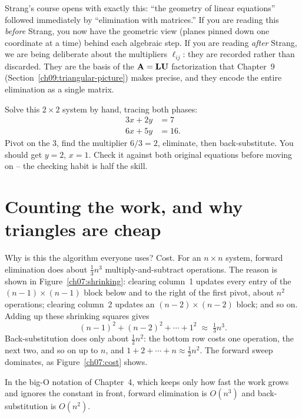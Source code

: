 \begin{strangbox}
Strang's course opens with exactly this: ``the geometry of linear equations''
followed immediately by ``elimination with matrices.'' If you are reading this
\emph{before} Strang, you now have the geometric view (planes pinned down one
coordinate at a time) behind each algebraic step.
If you are reading \emph{after} Strang, we are being deliberate about
the multipliers $\ell_{ij}$: they are recorded rather than discarded.
They are the basis of the $\mathbf{A}=\mathbf{LU}$ factorization that Chapter~9 (Section~\ref{ch09:triangular-picture})
makes precise, and they encode the entire elimination as a single matrix.
\end{strangbox}

\begin{labbox}
Solve this $2\times 2$ system by hand, tracing both phases:
\[
\begin{aligned}
3x + 2y &= 7\\
6x + 5y &= 16.
\end{aligned}
\]
Pivot on the $3$, find the multiplier $6/3 = 2$, eliminate, then back-substitute.
You should get $y = 2$, $x = 1$. Check it against both original equations before
moving on -- the checking habit is half the skill.
\end{labbox}

\section{Counting the work, and why triangles are cheap}

Why is this the algorithm everyone uses? Cost. For an $n\times n$ system, forward
elimination does about $\tfrac13 n^3$ multiply-and-subtract operations. The
reason is shown in Figure~\ref{ch07:shrinking}: clearing column~1 updates every
entry of the $(n-1)\times(n-1)$ block below and to the right of the first pivot,
about $n^2$ operations; clearing column~2 updates an $(n-2)\times(n-2)$ block;
and so on. Adding up these shrinking squares gives
\[
(n-1)^2 + (n-2)^2 + \cdots + 1^2 \;\approx\; \tfrac13 n^3 .
\]
Back-substitution does only about $\tfrac12 n^2$: the bottom row costs one
operation, the next two, and so on up to $n$, and $1+2+\cdots+n\approx\tfrac12 n^2$.
The forward sweep dominates, as Figure~\ref{ch07:cost} shows.

In the big-O notation of Chapter~4, which keeps only how fast the work grows and
ignores the constant in front, forward elimination is $O(n^3)$ and
back-substitution is $O(n^2)$.


